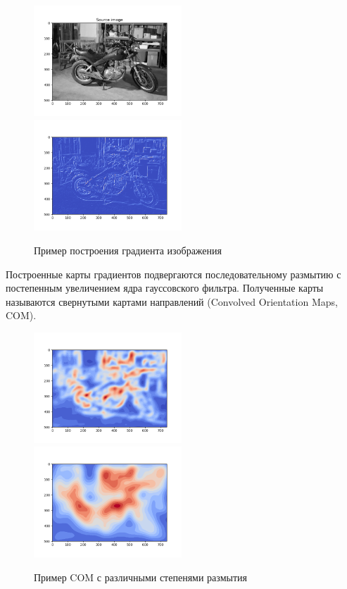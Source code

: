 {{{{		\begin{figure}[H]
			\centering                             
			\includegraphics[width=0.495\textwidth,keepaspectratio]{daisy/bike_source.png}   
			\includegraphics[width=0.495\textwidth,keepaspectratio]{daisy/bike_gradient.png}       
			\centering\caption{ Пример построения градиента изображения }
			\label{gradient_example}                           
		\end{figure}    
		
		Построенные карты градиентов подвергаются последовательному размытию с постепенным увеличением ядра гауссовского фильтра. Полученные карты называются свернутыми картами направлений (Convolved Orientation Maps, COM).
		
		\begin{figure}[H]
			\centering                             
			\includegraphics[width=0.495\textwidth,keepaspectratio]{daisy/bike_gradient_COM_1.png}   
			\includegraphics[width=0.495\textwidth,keepaspectratio]{daisy/bike_gradient_COM_2.png}       
			\centering\caption{ Пример COM с различными степенями размытия }
			\label{gradient_example}                           
		\end{figure}    
		
}}}}
